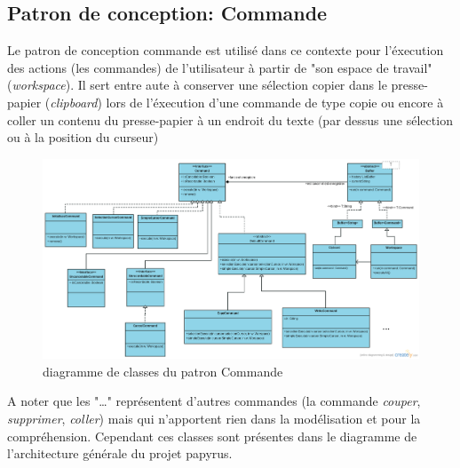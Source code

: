 \documentclass[pdftex,12pt,a4paper]{article}
\begin{document}
        	\newpage

         
   \subsection{Patron de conception: Commande}

Le patron de conception commande est utilisé dans ce contexte pour l'éxecution des actions (les commandes) de l'utilisateur à partir de "son espace de travail" (\emph{workspace}). Il sert entre aute à conserver une sélection copier dans le presse-papier (\emph{clipboard}) lors de l'éxecution d'une commande de type copie ou encore à coller un contenu du presse-papier à un endroit du texte (par dessus une sélection ou à la position du curseur) 
        
        \begin{figure}[htb]
        	\begin{center}
        	\includegraphics[width=1.1\textwidth]{./commandGl.png}\caption{diagramme de classes du patron Commande}
             \end{center}
      	\end{figure}
        
 A noter que les "\dots" représentent d'autres commandes (la commande \emph{couper}, \emph{supprimer}, \emph{coller})  mais qui n'apportent rien dans la modélisation et pour la compréhension. Cependant ces classes sont présentes dans le diagramme de l'architecture générale du projet papyrus.
 		\newpage
\end{document}
